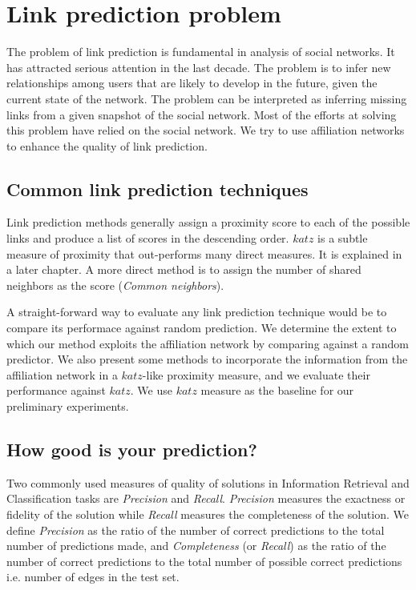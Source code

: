 \documentclass{report}
\begin{document}
\section {Link prediction problem}
The problem of link prediction is fundamental in analysis of social networks. It has attracted serious attention in the last decade. The problem is to infer new relationships among users that are likely to develop in the future, given the current state of the network. The problem can be interpreted as inferring missing links from a given snapshot of the social network. Most of the efforts at solving this problem have relied on the social network. We try to use affiliation networks to enhance the quality of link prediction.

\subsection{Common link prediction techniques}
Link prediction methods generally assign a proximity score to each of the possible links and produce a list of scores in the descending order. $katz$ is a subtle measure of proximity that out-performs many direct measures. It is explained in a later chapter. A more direct method is to assign the number of shared neighbors as the score (\textit{Common neighbors}).

A straight-forward way to evaluate any link prediction technique would be to compare its performace against random prediction\cite{kleinberg}. We determine the extent to which our method exploits the affiliation network by comparing against a random predictor. We also present some methods to incorporate the information from the affiliation network in a $katz$-like proximity measure, and we evaluate their performance against $katz$. We use $katz$ measure as the baseline for our preliminary experiments.

\subsection{How good is your prediction?}
Two commonly used measures of quality of solutions in Information Retrieval and Classification tasks are \textit{Precision} and \textit{Recall}. \textit{Precision} measures the exactness or fidelity of the solution while \textit{Recall} measures the completeness of the solution. We define \textit{Precision} as the ratio of the number of correct predictions to the total number of predictions made, and \textit{Completeness} (or \textit{Recall}) as the ratio of the number of correct predictions to the total number of possible correct predictions i.e. number of edges in the test set.
\end{document}
